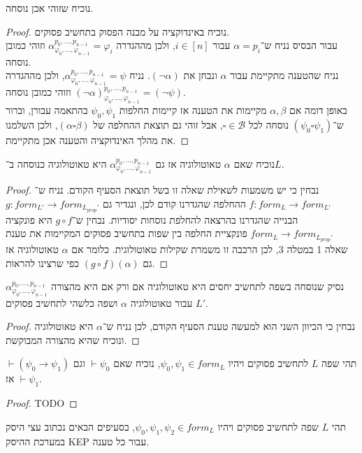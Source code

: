 \subquestion{}
נוכיח שזוהי אכן נוסחה.
\begin{proof}
	נוכיח באינדוקציה על מבנה הפסוק בתחשיב פסוקים. \\
	עבור הבסיס נניח ש־$\alpha = p_i$ עבור $i \in [n]$, ולכן מההגדרה $\alpha_{\varphi_0, \dots, \varphi_{n - 1}}^{p_0, \dots, p_{n - 1}} = \varphi_i$ וזוהי כמובן נוסחה. \\
	נניח שהטענה מתקיימת עבור $\alpha$ ונבחן את $(\lnot \alpha)$. נניח $\alpha_{\varphi_0, \dots, \varphi_{n - 1}}^{p_0, \dots, p_{n - 1}} = \psi$,
	ולכן מההגדרה ${(\lnot \alpha)}_{\varphi_0, \dots, \varphi_{n - 1}}^{p_0, \dots, p_{n - 1}} = (\lnot \psi)$ וזוהי כמובן נוסחה. \\
	באופן דומה אם $\alpha, \beta$ מקיימות את הטענה אז קיימות החלפות $\psi_0, \psi_1$ בהתאמה עבורן, וברור ש־$(\psi_0 \square \psi_1)$ נוסחה לכל $\square \in \mathcal{B}$,
	אבל זוהי גם תוצאת ההחלפה של $(\alpha \square \beta)$, ולכן השלמנו את מהלך האינדוקציה והטענה אכן מתקיימת.
\end{proof}

\subquestion{}
נוכיח שאם $\alpha$ טאוטולוגיה אז גם $\alpha_{\varphi_0, \dots, \varphi_{n - 1}}^{p_0, \dots, p_{n - 1}}$ היא טאוטולוגיה כנוסחה ב־$L$.
\begin{proof}
	נבחין כי יש משמעות לשאילת שאלה זו בשל תוצאת הסעיף הקודם.
	נניח ש־$f : form_L \to form_{L'}$ ההחלפה שהגדרנו קודם לכן, ונגדיר גם $g : form_{L'} \to form_{L_{prop}'}$ הבנייה שהגדרנו בהרצאה להחלפת נוסחות יסודיות.
	נבחין ש־$g \circ f$ היא פונקציה $form_L \to form_{L_{prop}'}$ פונקציית החלפה בין שפות בתחשיב פסוקים המקיימות את טענת שאלה 1 במטלה 3, לכן הרכבה זו משמרת שקילות טאוטולוגית.
	כלומר אם $\alpha$ טאוטולוגיה אז גם $(g \circ f)(\alpha)$ כפי שרצינו להראות.
\end{proof}

\subquestion{}
נסיק שנוסחה בשפה לתחשיב יחסים היא טאוטולוגיה אם ורק אם היא מהצורה $\alpha_{\varphi_0, \dots, \varphi_{n - 1}}^{p_0, \dots, p_{n - 1}}$ עבור טאוטולוגיה $\alpha$ ושפה כלשהי לתחשיב פסוקים $L'$.
\begin{proof}
	נבחין כי הכיוון השני הוא למעשה טענת הסעיף הקודם, לכן נניח ש־$\alpha$ היא טאוטולוגיה ונוכיח שהיא מהצורה המבוקשת.
\end{proof}

\question{}
תהי שפה $L$ לתחשיב פסוקים ויהיו $\psi_0, \psi_1 \in form_L$, נוכיח שאם $\vdash \psi_0$ וגם $\vdash (\psi_0 \to \psi_1)$ אז $\vdash \psi_1$.
\begin{proof}
	TODO
\end{proof}

\question{}
תהי $L$ שפה לתחשיב פסוקים ויהיו $\psi_0, \psi_1, \psi_2 \in form_L$, בסעיפים הבאים נכתוב עצי היסק במערכת ההיסק KEP עבור כל טענה.

